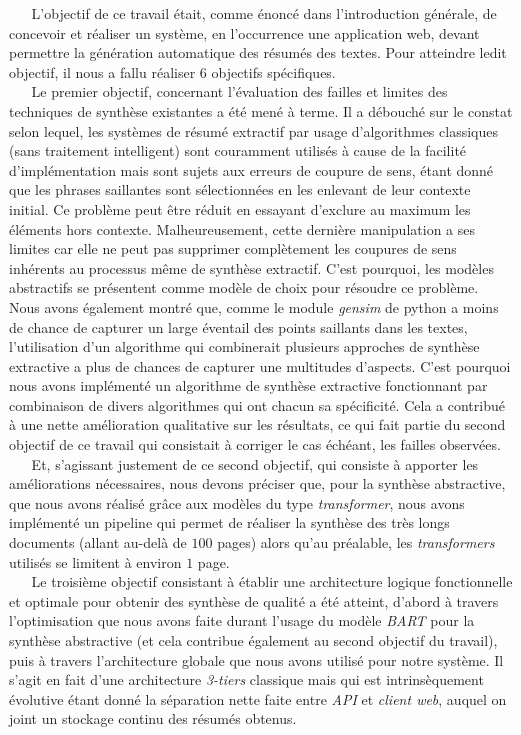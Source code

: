 $ _{} $ $ _{} $ $ _{} $ $ _{} $ $ _{} $L'objectif de ce travail était, comme énoncé dans l'introduction générale, de concevoir et réaliser un système, en l'occurrence une application web, devant permettre la génération automatique des résumés des textes. Pour atteindre ledit objectif, il nous a fallu réaliser $ 6 $ objectifs spécifiques.\\
$ _{} $ $ _{} $ $ _{} $ $ _{} $ $ _{} $Le premier objectif, concernant l'évaluation des failles et limites des techniques de synthèse existantes a été mené à terme. Il a débouché sur le constat selon lequel, les systèmes de résumé extractif par usage d'algorithmes classiques (sans traitement intelligent) sont couramment utilisés à cause de la facilité d'implémentation mais sont sujets aux erreurs de coupure de sens, étant donné que les phrases saillantes sont sélectionnées en les enlevant de leur contexte initial. Ce problème peut être réduit en essayant d'exclure au maximum les éléments hors contexte. Malheureusement, cette dernière manipulation a ses limites car elle ne peut pas supprimer complètement les coupures de sens inhérents au processus même de synthèse extractif. C'est pourquoi, les modèles abstractifs se présentent comme modèle de choix pour résoudre ce problème. Nous avons également montré que, comme le module \textit{gensim} de python a moins de chance de capturer un large éventail des points saillants dans les textes, l'utilisation d'un algorithme qui combinerait plusieurs approches de synthèse extractive a plus de chances de capturer une multitudes d'aspects. C'est pourquoi nous avons implémenté un algorithme de synthèse extractive fonctionnant par combinaison de divers algorithmes qui ont chacun sa spécificité. Cela a contribué à une nette amélioration qualitative sur les résultats, ce qui fait partie du second objectif de ce travail qui consistait à corriger le cas échéant, les failles observées.\\
$ _{} $ $ _{} $ $ _{} $ $ _{} $ $ _{} $Et, s'agissant justement de ce second objectif, qui consiste à apporter les améliorations nécessaires, nous devons préciser que, pour la synthèse abstractive, que nous avons réalisé grâce aux modèles du type \textit{transformer}, nous avons implémenté un pipeline qui permet de réaliser la synthèse des très longs documents (allant au-delà de $ 100 $ pages) alors qu'au préalable, les \textit{transformers} utilisés se limitent à environ $ 1 $ page.\\
$ _{} $ $ _{} $ $ _{} $ $ _{} $ $ _{} $Le troisième objectif consistant à établir une architecture logique fonctionnelle et optimale pour obtenir des synthèse de qualité a été atteint, d'abord à travers l'optimisation que nous avons faite durant l'usage du modèle \textit{BART} pour la synthèse abstractive (et cela contribue également au second objectif du travail), puis à travers l'architecture globale que nous avons utilisé pour notre système. Il s'agit en fait d'une architecture \textit{3-tiers} classique mais qui est in\-trin\-sè\-que\-ment évolutive étant donné la séparation nette faite entre \textit{API} et \textit{client web}, auquel on joint un stockage continu des résumés obtenus.\\
